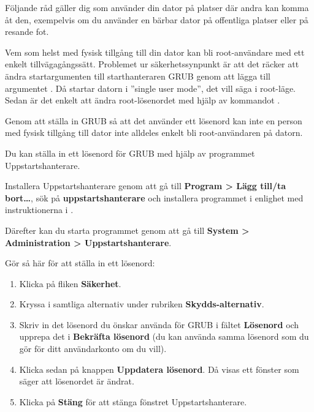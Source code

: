 \documentclass[a4paper,final]{memoir} %
\begin{document}
Följande råd gäller dig som använder din dator på platser där andra kan komma åt den, exempelvis om du använder en bärbar dator på offentliga platser eller på resande fot.

Vem som helst med fysisk tillgång till din dator kan bli root-användare med ett enkelt tillvägagångssätt. Problemet ur säkerhetssynpunkt är att det räcker att ändra startargumenten till starthanteraren GRUB genom att lägga till argumentet . Då startar datorn i ''single user mode'', det vill säga i root-läge. Sedan är det enkelt att ändra root-lösenordet med hjälp av kommandot .

Genom att ställa in GRUB så att det använder ett lösenord kan inte en person med fysisk tillgång till dator inte alldeles enkelt bli root-användaren på datorn.

Du kan ställa in ett lösenord för GRUB med hjälp av programmet Uppstartshanterare.

Installera Uppstartshanterare genom att gå till \textbf{Program \textgreater{} Lägg till/ta bort\ldots{}}, sök på \textbf{uppstartshanterare} och installera programmet i enlighet med instruktionerna i .

Därefter kan du starta programmet genom att gå till \textbf{System \textgreater{} Administration \textgreater{} Uppstartshanterare}. 

Gör så här för att ställa in ett lösenord:

\begin{enumerate}

\item Klicka på fliken \textbf{Säkerhet}.

\item Kryssa i samtliga alternativ under rubriken \textbf{Skydds-alternativ}.

\item Skriv in det lösenord du önskar använda för GRUB i fältet \textbf{Lösenord} och upprepa det i \textbf{Bekräfta lösenord} (du kan använda samma lösenord som du gör för ditt användarkonto om du vill).

\item Klicka sedan på knappen \textbf{Uppdatera lösenord}. Då visas ett fönster som säger att lösenordet är ändrat.

\item Klicka på \textbf{Stäng} för att stänga fönstret Uppstartshanterare.

\end{enumerate}
\end{document}
